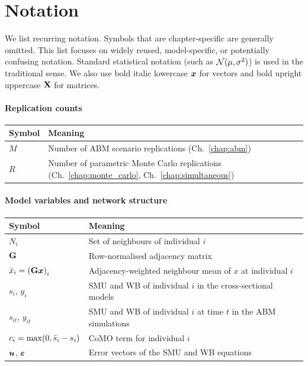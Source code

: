 
\chapter*{Notation}

We list recurring notation. Symbols that are chapter-specific are generally omitted. This list focuses on widely reused, model-specific, or potentially confusing notation. Standard statistical notation (such as $\mathcal{N}(\mu, \sigma^2)$) is used in the traditional sense. We also use bold italic lowercase $\bm{x}$ for vectors and bold upright uppercase $\mathbf{X}$ for matrices.

\subsubsection*{Replication counts}
\noindent\begin{tabular}{@{}l>{\raggedright\arraybackslash}p{}@{}}
\toprule
\textbf{Symbol} & \textbf{Meaning} \\
\midrule
$M$ & Number of ABM scenario replications (Ch.~\ref{chap:abm}) \\
$R$ & Number of parametric Monte Carlo replications (Ch.~\ref{chap:monte_carlo}, Ch.~\ref{chap:simultaneous}) \\
\bottomrule
\end{tabular}

\subsubsection*{Model variables and network structure}
\noindent\begin{tabular}{@{}l>{\raggedright\arraybackslash}p{}@{}}
\toprule
\textbf{Symbol} & \textbf{Meaning} \\
\midrule
$N_i$ & Set of neighbours of individual $i$ \\
$\mathbf{G}$ & Row-normalised adjacency matrix \\
$\bar{x}_i = {(\mathbf{G}\bm{x})}_i$ & Adjacency-weighted neighbour mean of $x$ at individual $i$ \\
\midrule
$s_i$, $y_i$ & SMU and WB of individual $i$ in the cross-sectional models \\
$s_{it}$, $y_{it}$ & SMU and WB of individual $i$ at time $t$ in the ABM simulations \\
$c_i = \max(0,\bar{s}_i - s_i)$ & CoMO term for individual $i$ \\
$\bm{u}$, $\bm{\varepsilon}$ & Error vectors of the SMU and WB equations \\
\bottomrule
\end{tabular}


